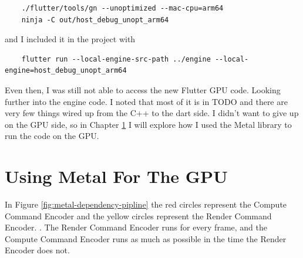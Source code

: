 \begin{verbatim}
    ./flutter/tools/gn --unoptimized --mac-cpu=arm64
    ninja -C out/host_debug_unopt_arm64
\end{verbatim}

and I included it in the project with 
\begin{verbatim}
    flutter run --local-engine-src-path ../engine --local-engine=host_debug_unopt_arm64
\end{verbatim}

Even then, I was still not able to access the new Flutter GPU code. Looking further into the engine code. I noted that most of it is in TODO and there are very few things wired up from the C++ to the dart side. I didn't want to give up on the GPU side, so in Chapter \ref{chap:metal} I will explore how I used the Metal library to run the code on the GPU.

\section{Using Metal For The GPU}\label{chap:metal}

In Figure \ref{fig:metal-dependency-pipline} the red circles represent the Compute Command Encoder and the yellow circles represent the Render Command Encoder.     .
The Render Command Encoder runs for every frame, and the Compute Command Encoder runs as much as possible in the time the Render Encoder does not.

